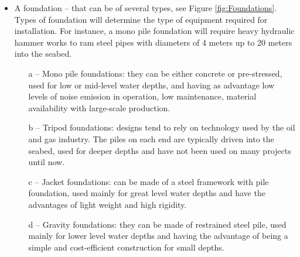 \begin{itemize}
\item A foundation -- that can be of several types, see Figure \ref{fig:Foundations}. Types of foundation will determine the type of equipment required for installation. For instance, a mono pile foundation will require heavy hydraulic hammer works to ram steel pipes with diameters of 4 meters up to 20 meters into the seabed.

\begin{enumerate}
\item[a] -- Mono pile foundations: they can be either concrete or pre-stressed, used for low or mid-level water depths, and having as advantage low levels of noise emission in operation, low maintenance, material availability with large-scale production.
\item[b] -- Tripod foundations: designs tend to rely on technology used by the oil and gas industry. The piles on each end are typically driven into the seabed, used for deeper depths and have not been used on many projects until now.
\item[c] -- Jacket foundations: can be made of a steel framework with pile foundation, used mainly for great level water depths and have the advantages of light weight and high rigidity.
\item[d] -- Gravity foundations: they can be made of restrained steel pile, used mainly for lower level water depths and having the advantage of being a simple and cost-efficient construction for small depths. 
\end{enumerate}


\end{itemize}
